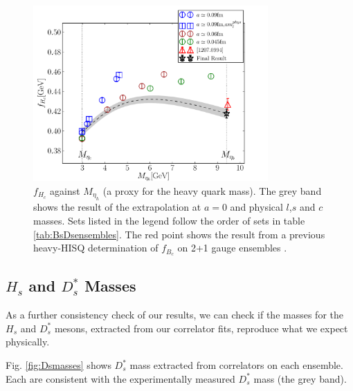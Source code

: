 \begin{figure}[htb!]
  \begin{center}
  \hspace{-20pt}
  \includegraphics[width=0.80\textwidth]{images/BsDsstar/fHcvsmh.pdf}
  \caption{ $f_{H_c}$ against $M_{\eta_h}$ (a proxy for the heavy quark mass). The grey band shows the result of the extrapolation at $a=0$ and physical $l$,$s$ and $c$ masses. Sets listed in the legend follow the order of sets in table \ref{tab:BsDsensembles}. The red point shows the result from a previous heavy-HISQ determination of $f_{B_c}$ on 2+1 gauge ensembles \cite{McNeile:2012qf}. \label{fig:fHc_vsmh}}
  \end{center}
\end{figure}

\subsection{$H_s$ and $D_s^*$ Masses}

As a further consistency check of our results, we can check if the masses for the $H_s$ and $D_s^*$ mesons, extracted from our correlator fits, reproduce what we expect physically.

Fig. \ref{fig:Dsmasses} shows $D_s^*$ mass extracted from correlators on each ensemble. Each are consistent with the experimentally measured $D_s^*$ mass (the grey band).


